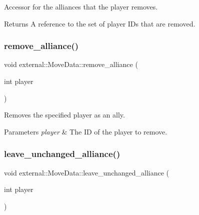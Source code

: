Accessor for the alliances that the player removes. 

\begin{DoxyReturn}{Returns}
A reference to the set of player I\+Ds that are removed. 
\end{DoxyReturn}
\mbox{\label{classexternal_1_1_move_data_a397656419a2c5adf79ee8bf1bfae9ca8}} 
\subsubsection{\texorpdfstring{remove\+\_\+alliance()}{remove\_alliance()}}
{\footnotesize\ttfamily void external\+::\+Move\+Data\+::remove\+\_\+alliance (\begin{DoxyParamCaption}\item[{int}]{player }\end{DoxyParamCaption})\hspace{0.3cm}{\ttfamily [inline]}}



Removes the specified player as an ally. 


\begin{DoxyParams}{Parameters}
{\em player} & The ID of the player to remove. \\
\hline
\end{DoxyParams}
\mbox{\label{classexternal_1_1_move_data_a15f54d7e6fbf21cc9634e6f2bb854317}} 
\subsubsection{\texorpdfstring{leave\+\_\+unchanged\+\_\+alliance()}{leave\_unchanged\_alliance()}}
{\footnotesize\ttfamily void external\+::\+Move\+Data\+::leave\+\_\+unchanged\+\_\+alliance (\begin{DoxyParamCaption}\item[{int}]{player }\end{DoxyParamCaption})\hspace{0.3cm}{\ttfamily [inline]}}



